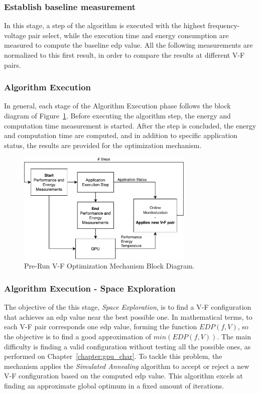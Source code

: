 \subsubsection{Establish baseline measurement}

In this stage, a step of the algorithm is executed with the highest frequency-voltage pair select, while the execution time and energy consumption are measured to compute the baseline \acrshort{edp} value. All the following measurements are normalized to this first result, in order to compare the results at different V-F pairs.


\subsubsection{Algorithm Execution}

In general, each stage of the Algorithm Execution phase follows the block diagram of Figure~\ref{fig:detail_mech}. Before executing the algorithm step, the energy and computation time measurement is started. After the step is concluded, the energy and computation time are computed, and in addition to specific application status, the results are provided for the optimization mechanism. 

\begin{figure}[htb]
  \centering
  \includegraphics[width=0.75\textwidth]{Figures/Optimization/opt_pre_run.pdf}
  \caption{Pre-Run V-F Optimization Mechanism Block Diagram.}
  \label{fig:detail_mech}
\end{figure}

\subsubsection{Algorithm Execution - Space Exploration}

The objective of the this stage, \textit{Space Exploration}, is to find a V-F configuration that achieves an \acrshort{edp} value near the best possible one. In mathematical terms, to each V-F pair corresponds one \acrshort{edp} value, forming the function $EDP(f, V)$, so the objective is to find a good approximation of $min(EDP(f, V))$. The main difficulty is finding a valid configuration without testing all the possible ones, as performed on Chapter~\ref{chapter:gpu_char}. To tackle this problem, the mechanism applies the \textit{Simulated Annealing} algorithm to accept or reject a new V-F configuration based on the computed \acrshort{edp} value. This algorithm excels at finding an approximate global optimum in a fixed amount of iterations. 


